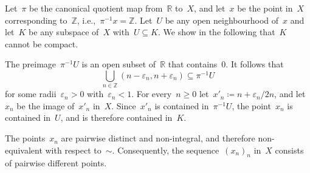%
%
%
%
%

Let~$π$ be the canonical quotient map from~$ℝ$ to~$X$, and let~$x$ be the point in~$X$ corresponding to~$ℤ$, i.e.,~$π^{-1} x = ℤ$.
Let~$U$ be any open neighbourhood of~$x$ and let~$K$ be any subspace of~$X$ with~$U ⊆ K$.
We show in the following that~$K$ cannot be compact.

The preimage~$π^{-1} U$ is an open subset of~$ℝ$ that contains~$0$.
It follows that
\[
	⋃_{n ∈ ℤ} {} (n - ε_n, n + ε_n) ⊆ π^{-1} U
\]
for some radii~$ε_n > 0$ with~$ε_n < 1$.
For every~$n ≥ 0$ let~$x'_n ≔ n + ε_n / 2n$, and let~$x_n$ be the image of~$x'_n$ in~$X$.
Since~$x'_n$ is contained in~$π^{-1} U$, the point~$x_n$ is contained in~$U$, and is therefore contained in~$K$.

The points~$x_n$ are pairwise distinct and non-integral, and therefore non-equivalent with respect to~$∼$.
Consequently, the sequence~$(x_n)_n$ in~$X$ consists of pairwise different points.

